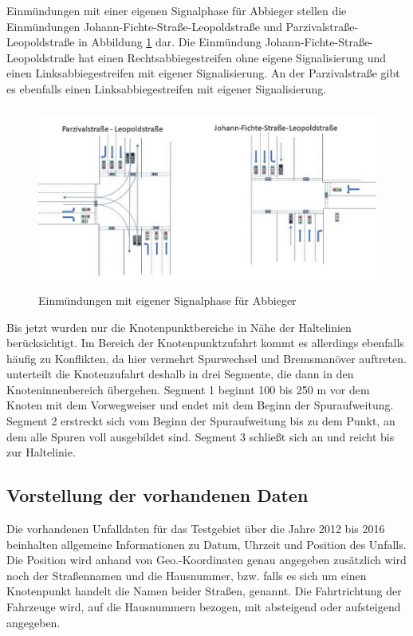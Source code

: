 Einmündungen mit einer eigenen Signalphase für Abbieger stellen die Einmündungen Johann-Fichte-Straße-Leopoldstraße und Parzivalstraße-Leopoldstraße in Abbildung \ref{fig:Einmüngungen_eigene_Phase} dar. Die Einmündung Johann-Fichte-Straße-Leopoldstraße hat einen Rechtsabbiegestreifen ohne eigene Signalisierung und einen Linksabbiegestreifen mit eigener Signalisierung. An der Parzivalstraße gibt es ebenfalls einen Linksabbiegestreifen mit eigener Signalisierung.  

\begin{savenotes}
	\begin{figure}[H]
		\centering
		\includegraphics[width=12cm,height=6cm]{figures/Einmuendungen_eigene_Phase}
		\caption[Einmündungen mit eigener Signaphase für Abbieger]{Einmündungen mit eigener Signalphase für Abbieger}\label{fig:Einmüngungen_eigene_Phase}
	\end{figure}
\end{savenotes}

Bis jetzt wurden nur die Knotenpunktbereiche in Nähe der Haltelinien berücksichtigt. Im Bereich der Knotenpunktzufahrt kommt es allerdings ebenfalls häufig zu Konflikten, da hier vermehrt Spurwechsel und Bremsmanöver auftreten. \Textcite[S.19]{Erke.1978} unterteilt die Knotenzufahrt deshalb in drei Segmente, die dann in den Knoteninnenbereich übergehen. Segment 1 beginnt 100 bis 250 m vor dem Knoten mit dem Vorwegweiser und endet mit dem Beginn der Spuraufweitung. Segment 2 erstreckt sich vom Beginn der Spuraufweitung bis zu dem Punkt, an dem alle Spuren voll ausgebildet sind. Segment 3 schließt sich an und reicht bis zur Haltelinie. %


\subsection{Vorstellung der vorhandenen Daten}
Die vorhandenen Unfalldaten für das Testgebiet über die Jahre 2012 bis 2016 beinhalten allgemeine Informationen zu Datum, Uhrzeit und Position des Unfalls. Die Position wird anhand von Geo.-Koordinaten genau angegeben zusätzlich wird noch der Straßennamen und die Hausnummer, bzw. falls es sich um einen Knotenpunkt handelt die Namen beider Straßen, genannt. Die Fahrtrichtung der Fahrzeuge wird, auf die Hausnummern bezogen, mit absteigend oder aufsteigend angegeben.

